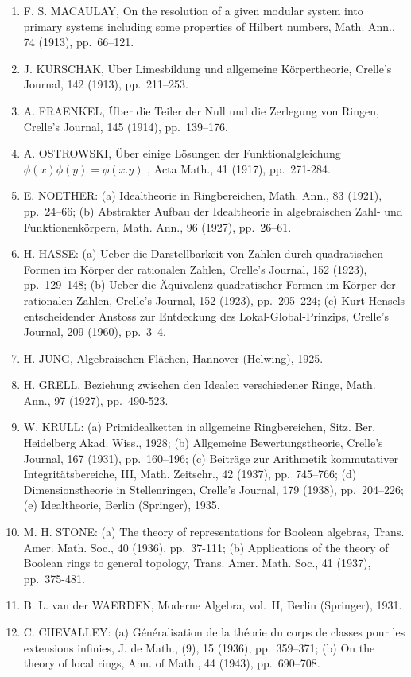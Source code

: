 \begin{enumerate}
\item
  F. S. MACAULAY, On the resolution of a given modular system into primary systems including some properties of Hilbert numbers, Math. Ann., 74 (1913), pp.~66--121.
\item
  J. KÜRSCHAK, Über Limesbildung und allgemeine Körpertheorie, Crelle's Journal, 142 (1913), pp.~211--253.
\item
  A. FRAENKEL, Über die Teiler der Null und die Zerlegung von Ringen, Crelle's Journal, 145 (1914), pp.~139--176.
\item
  A. OSTROWSKI, Über einige Lösungen der Funktionalgleichung \(\phi(x)\phi(y) = \phi(x.y)\) , Acta Math., 41 (1917), pp.~271-284.
\item
  E. NOETHER: (a) Idealtheorie in Ringbereichen, Math. Ann., 83 (1921), pp.~24--66; (b) Abstrakter Aufbau der Idealtheorie in algebraischen Zahl- und Funktionenkörpern, Math. Ann., 96 (1927), pp.~26--61.
\item
  H. HASSE: (a) Ueber die Darstellbarkeit von Zahlen durch quadratischen Formen im Körper der rationalen Zahlen, Crelle's Journal, 152 (1923), pp.~129--148; (b) Ueber die Äquivalenz quadratischer Formen im Körper der rationalen Zahlen, Crelle's Journal, 152 (1923), pp.~205--224; (c) Kurt Hensels entscheidender Anstoss zur Entdeckung des Lokal-Global-Prinzips, Crelle's Journal, 209 (1960), pp.~3--4.
\item
  H. JUNG, Algebraischen Flächen, Hannover (Helwing), 1925.
\item
  H. GRELL, Beziehung zwischen den Idealen verschiedener Ringe, Math. Ann., 97 (1927), pp.~490-523.
\item
  W. KRULL: (a) Primidealketten in allgemeine Ringbereichen, Sitz. Ber. Heidelberg Akad. Wiss., 1928; (b) Allgemeine Bewertungstheorie, Crelle's Journal, 167 (1931), pp.~160--196; (c) Beiträge zur Arithmetik kommutativer Integritätsbereiche, III, Math. Zeitschr., 42 (1937), pp.~745--766; (d) Dimensionstheorie in Stellenringen, Crelle's Journal, 179 (1938), pp.~204--226; (e) Idealtheorie, Berlin (Springer), 1935.
\item
  M. H. STONE: (a) The theory of representations for Boolean algebras, Trans. Amer. Math. Soc., 40 (1936), pp.~37-111; (b) Applications of the theory of Boolean rings to general topology, Trans. Amer. Math. Soc., 41 (1937), pp.~375-481.
\item
  B. L. van der WAERDEN, Moderne Algebra, vol.~II, Berlin (Springer), 1931.
\item
  C. CHEVALLEY: (a) Généralisation de la théorie du corps de classes pour les extensions infinies, J. de Math., (9), 15 (1936), pp.~359--371; (b) On the theory of local rings, Ann. of Math., 44 (1943), pp.~690--708.

\end{enumerate}
